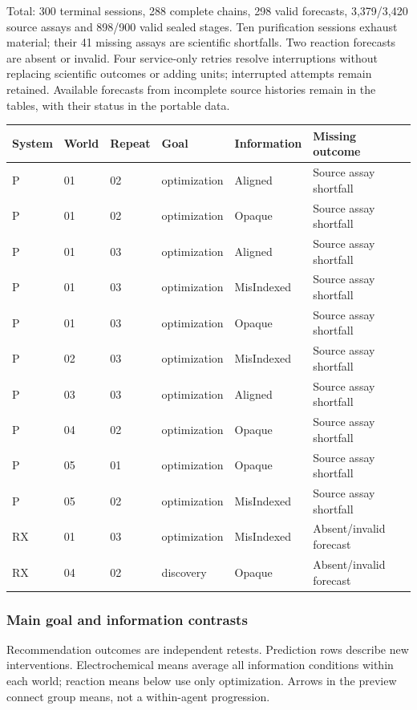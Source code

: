 \documentclass[10pt,a4paper]{article}
\begin{document}
Total: 300 terminal sessions, 288 complete chains, 298 valid forecasts, 3,379/3,420 source assays and 898/900 valid sealed stages. Ten purification sessions exhaust material; their 41 missing assays are scientific shortfalls. Two reaction forecasts are absent or invalid. Four service-only retries resolve interruptions without replacing scientific outcomes or adding units; interrupted attempts remain retained. Available forecasts from incomplete source histories remain in the tables, with their status in the portable data.

{\def\LTcaptype{table} %
\small\begin{longtable}[]{@{}llllll@{}}
\toprule\noalign{}
System & World & Repeat & Goal & Information & Missing outcome \\
\midrule\noalign{}
\endhead
\bottomrule\noalign{}
\endlastfoot
P & 01 & 02 & optimization & Aligned & Source assay shortfall \\
P & 01 & 02 & optimization & Opaque & Source assay shortfall \\
P & 01 & 03 & optimization & Aligned & Source assay shortfall \\
P & 01 & 03 & optimization & MisIndexed & Source assay shortfall \\
P & 01 & 03 & optimization & Opaque & Source assay shortfall \\
P & 02 & 03 & optimization & MisIndexed & Source assay shortfall \\
P & 03 & 03 & optimization & Aligned & Source assay shortfall \\
P & 04 & 02 & optimization & Opaque & Source assay shortfall \\
P & 05 & 01 & optimization & Opaque & Source assay shortfall \\
P & 05 & 02 & optimization & MisIndexed & Source assay shortfall \\
RX & 01 & 03 & optimization & MisIndexed & Absent/invalid forecast \\
RX & 04 & 02 & discovery & Opaque & Absent/invalid forecast \\
\end{longtable}\normalsize
}

\subsubsection{Main goal and information contrasts}\label{main-goal-and-information-contrasts}

Recommendation outcomes are independent retests. Prediction rows describe new interventions. Electrochemical means average all information conditions within each world; reaction means below use only optimization. Arrows in the preview connect group means, not a within-agent progression.
\end{document}
